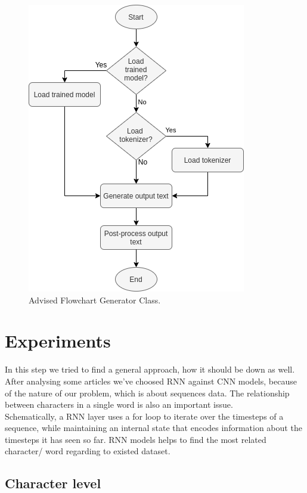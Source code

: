 \documentclass[hidelinks, conference]{IEEEtran}
\begin{document}
\begin{figure}[htbp]
\centerline{\includegraphics[scale=0.65]{pictures/flowchart_generator.png}}
\caption{Advised Flowchart Generator Class.}
\label{fig:flowchart_generator}
\end{figure}

\section{Experiments}

In this step we tried to find a general approach, how it should be down as well. After analysing some articles we’ve choosed RNN against CNN models, because of the nature of our problem, which is about sequences data. The relationship between characters in a single word is also an important issue.\\
Schematically, a RNN layer uses a for loop to iterate over the timesteps of a sequence, while maintaining an internal state that encodes information about the timesteps it has seen so far. RNN models helps to find the most related character/ word regarding to existed dataset.

\subsection{Character level}\label{subsec_character_level}
\end{document}
